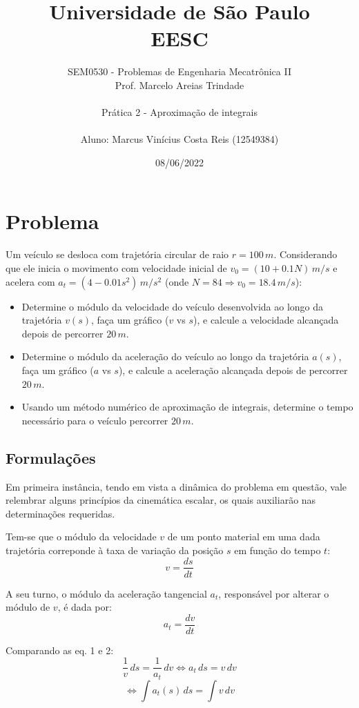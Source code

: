 \documentclass[a4paper, 12pt]{article}
\title{Universidade de São Paulo \\ EESC}
\author{SEM0530 - Problemas de Engenharia Mecatrônica II \\ 
Prof. Marcelo Areias Trindade \\ \\ Prática 2 - Aproximação de integrais
\\ \\ Aluno: Marcus Vinícius Costa Reis (12549384)}
\date{08/06/2022}
\begin{document}
	\maketitle \newpage
	
	\section{Problema}
	
	Um veículo se desloca com trajetória circular de raio $r=100\,m$. Considerando que ele inicia o movimento com velocidade 
	inicial de $v_0=(10+0.1N)\,m/s$ e acelera com $a_t=(4-0.01s^2)\,m/s^2$ (onde $N=84\Rightarrow v_0=18.4\,m/s$):
	
	\begin{itemize}
		\item Determine o módulo da velocidade do veículo desenvolvida ao longo da trajetória $v(s)$, faça um gráfico 
		($v$ vs $s$), e calcule a velocidade alcançada depois de percorrer $20\,m$.
		\item Determine o módulo da aceleração do veículo ao longo da trajetória $a(s)$, faça um gráfico ($a$ vs $s$), e 
		calcule a aceleração alcançada depois de percorrer $20\,m$.
		\item Usando um método numérico de aproximação de integrais, determine o tempo necessário para o veículo 
		percorrer $20\,m$.
	\end{itemize}
	
	\subsection{Formulações}
	
	Em primeira instância, tendo em vista a dinâmica do problema em questão, vale relembrar alguns princípios da cinemática
	escalar, os quais auxiliarão nas determinações requeridas.
	
	Tem-se que o módulo da velocidade $v$ de um ponto material em uma dada trajetória correponde à taxa de variação da 
	posição $s$ em função do tempo $t$: \begin{equation} v=\dfrac{ds}{dt}	
	\end{equation}
	
	A seu turno, o módulo da aceleração tangencial $a_t$, responsável por alterar o módulo de $v$, é dada por: 
	\begin{equation} 
		a_t=\dfrac{dv}{dt}
	\end{equation}				
	
	Comparando as eq. 1 e 2:
	$$\dfrac{1}{v}\,ds=\dfrac{1}{a_t}\,dv \Longleftrightarrow a_t\,ds=v\,dv$$ 
	\begin{equation}
		\Longleftrightarrow \int a_t(s)\,ds=\int v\,dv
	\end{equation}		
	
\end{document}
